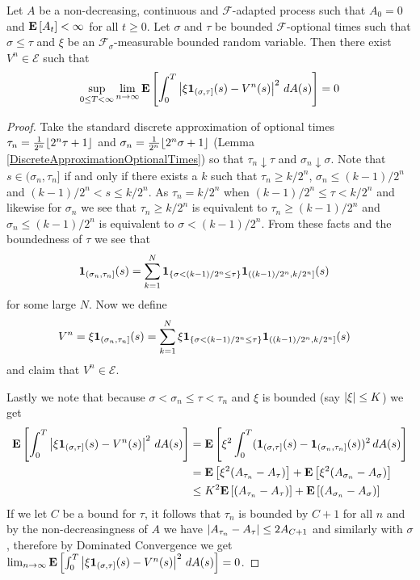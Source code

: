 \begin{lem}\label{SimpleProcessApproximationPredictableStepProcess}Let $A$ be a non-decreasing, continuous and $\mathcal{F}$-adapted process such that $A_0 = 0$ and $\textbf{E}\left[A_t\right] < \infty$ for all $t \geq 0$.  Let $\sigma$ and $\tau$ be bounded $\mathcal{F}$-optional times such that $\sigma \leq \tau$ and $\xi$ be an $\mathcal{F}_\sigma$-measurable bounded random variable.
Then there exist $V^n \in \mathcal{E}$ such that 
\begin{align*}
\sup_{0 \leq T < \infty} \lim_{n \to \infty} \textbf{E}\left[\int_0^T \left \vert \xi \textbf{1}_{(\sigma, \tau]}(s) - V^n(s) \right \vert^2 \, dA(s)\right] = 0
\end{align*}
\end{lem}
\begin{proof}
Take the standard discrete approximation of optional times $\tau_n = \frac{1}{2^n} \lfloor 2^n \tau + 1 \rfloor$ and $\sigma_n = \frac{1}{2^n} \lfloor 2^n \sigma + 1 \rfloor$ (Lemma \ref{DiscreteApproximationOptionalTimes}) so that $\tau_n \downarrow \tau$ and $\sigma_n \downarrow \sigma$.  Note that $s \in (\sigma_n, \tau_n]$ if and only if there exists a $k$ such that $\tau_n \geq k/2^n$, $\sigma_n \leq (k-1)/2^n$ and $(k-1)/2^n < s \leq k/2^n$.  As $\tau_n = k/2^n$ when $(k-1)/2^n \leq \tau < k/2^n$ and likewise for $\sigma_n$ we see that $\tau_n \geq k/2^n$ is equivalent to $\tau_n \geq (k-1)/2^n$ and $\sigma_n \leq (k-1)/2^n$ is equivalent to $\sigma < (k-1)/2^n$. From these facts and the boundedness of $\tau$ we see that 
\begin{align*}
\textbf{1}_{(\sigma_n, \tau_n]}(s) &= \sum_{k=1}^N \textbf{1}_{\lbrace \sigma < (k-1)/2^n \leq \tau \rbrace} \textbf{1}_{ ((k-1)/2^n, k/2^n]}(s)
\end{align*}
for some large $N$.  Now we define 
\begin{align*}
V^n &= \xi \textbf{1}_{(\sigma_n, \tau_n]}(s) = \sum_{k=1}^N \xi \textbf{1}_{\lbrace \sigma < (k-1)/2^n \leq \tau \rbrace} \textbf{1}_{ ((k-1)/2^n, k/2^n]}(s)
\end{align*}
and claim that $V^n \in \mathcal{E}$.  

Lastly we note that because $\sigma < \sigma_n \leq \tau < \tau_n$ and $\xi$ is bounded (say $\left \vert \xi \right \vert \leq K$) we get
\begin{align*}
\textbf{E}\left[\int_0^T \left \vert \xi \textbf{1}_{(\sigma, \tau]}(s) - V^n(s) \right \vert^2 \, dA(s)\right] &=\textbf{E}\left[\xi^2 \int_0^T (\textbf{1}_{(\sigma, \tau]}(s) - \textbf{1}_{(\sigma_n, \tau_n]}(s))^2 \, dA(s)\right] \\
&=\textbf{E}\left[\xi^2 (A_{\tau_n} - A_\tau)\right] + \textbf{E}\left[\xi^2 (A_{\sigma_n} - A_\sigma)\right] \\
&\leq K^2 \textbf{E}\left[ (A_{\tau_n} - A_\tau)\right] + \textbf{E}\left[(A_{\sigma_n} - A_\sigma)\right] \\
\end{align*}
If we let $C$ be a bound for $\tau$, it follows that $\tau_n$ is bounded by $C+1$ for all $n$ and by the non-decreasingness of $A$ we have $\left \vert A_{\tau_n} - A_\tau \right \vert \leq 2A_{C+1}$ and similarly with $\sigma$, therefore by Dominated Convergence we get $\lim_{n \to \infty} \textbf{E}\left[\int_0^T \left \vert \xi \textbf{1}_{(\sigma, \tau]}(s) - V^n(s) \right \vert^2 \, dA(s)\right]=0$.


\end{proof}
